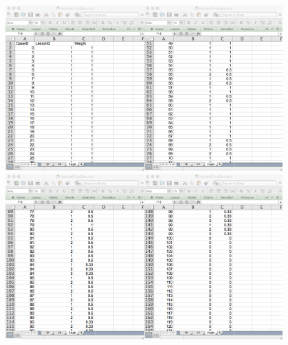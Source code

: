\documentclass[]{book}
\begin{document}
\includegraphics[width=0.4\textwidth,height=\textheight]{images/FROC-TP-Truth-1.png}\includegraphics[width=0.4\textwidth,height=\textheight]{images/FROC-TP-Truth-2.png}
\includegraphics[width=0.4\textwidth,height=\textheight]{images/FROC-TP-Truth-3.png}\includegraphics[width=0.4\textwidth,height=\textheight]{images/FROC-TP-Truth-4.png}
\end{document}
